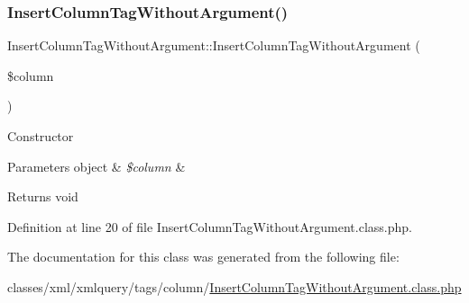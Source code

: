 \subsubsection{\texorpdfstring{Insert\+Column\+Tag\+Without\+Argument()}{InsertColumnTagWithoutArgument()}}
{\footnotesize\ttfamily Insert\+Column\+Tag\+Without\+Argument\+::\+Insert\+Column\+Tag\+Without\+Argument (\begin{DoxyParamCaption}\item[{}]{\$column }\end{DoxyParamCaption})}

Constructor


\begin{DoxyParams}[1]{Parameters}
object & {\em \$column} & \\
\hline
\end{DoxyParams}
\begin{DoxyReturn}{Returns}
void 
\end{DoxyReturn}


Definition at line 20 of file Insert\+Column\+Tag\+Without\+Argument.\+class.\+php.



The documentation for this class was generated from the following file\+:\begin{DoxyCompactItemize}
\item 
classes/xml/xmlquery/tags/column/\hyperlink{InsertColumnTagWithoutArgument_8class_8php}{Insert\+Column\+Tag\+Without\+Argument.\+class.\+php}\end{DoxyCompactItemize}
